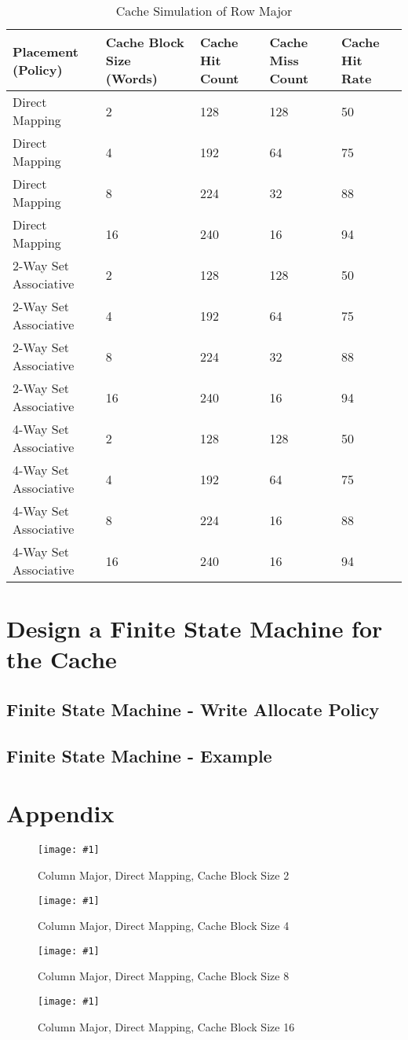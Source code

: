 \documentclass[11pt,a4paper]{article}
\newcommand{\cacheResultFigure}[3]{
\begin{figure}
	\centering
	\texttt{[image: \#1]}
	\caption{#2}
	\label{#3}
\end{figure}
}
\begin{document}
\begin{table}
\caption{Cache Simulation of Row Major}
\label{tab:tableRowMajor}
\begin{tabular}{lllll}
\hline %
Placement (Policy) & Cache Block Size (Words) & Cache Hit Count & Cache Miss Count & Cache Hit Rate \\
\hline %
Direct Mapping & 2 & 128 & 128 & 50  \\
Direct Mapping & 4 & 192 & 64 & 75  \\
Direct Mapping & 8 & 224 & 32 & 88  \\
Direct Mapping & 16 & 240 & 16 & 94  \\
2-Way Set Associative & 2 & 128 & 128 & 50 \\
2-Way Set Associative & 4 & 192 & 64 & 75 \\
2-Way Set Associative & 8 & 224 & 32 & 88 \\
2-Way Set Associative & 16 & 240 & 16 & 94 \\
4-Way Set Associative & 2 & 128 & 128 & 50 \\
4-Way Set Associative & 4 & 192 & 64 & 75 \\
4-Way Set Associative & 8 & 224 & 16 & 88 \\
4-Way Set Associative & 16 & 240 & 16 & 94 \\
\hline %
\end{tabular} 
\end{table}

\newpage
\section{Design a Finite State Machine for the Cache}

\subsection{Finite State Machine - Write Allocate Policy}


\subsection{Finite State Machine - Example}











\newpage
\section{Appendix}
\cacheResultFigure{pictures/task4_columnMajor_directMapping2}{Column Major, Direct Mapping, Cache Block Size 2}{fig:pic1}
\cacheResultFigure{pictures/task4_columnMajor_directMapping4}{Column Major, Direct Mapping, Cache Block Size 4}{fig:pic2}
\cacheResultFigure{pictures/task4_columnMajor_directMapping8}{Column Major, Direct Mapping, Cache Block Size 8}{fig:pic3}
\cacheResultFigure{pictures/task4_columnMajor_directMapping16}{Column Major, Direct Mapping, Cache Block Size 16}{fig:pic4}
\end{document}
